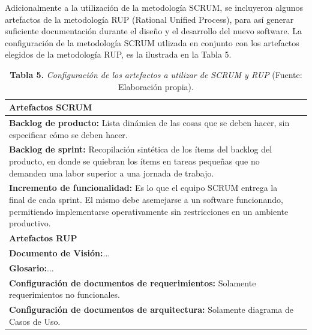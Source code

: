 \documentclass[12pt, a4paper]{article}
\begin{document}
Adicionalmente a la utilizaci\'{o}n de la metodolog\'{i}a SCRUM, se incluyeron algunos
artefactos de la metodolog\'{i}a RUP (Rational Unified Process), para as\'{i} generar suficiente documentaci\'{o}n durante el dise\~{n}o y el desarrollo del nuevo software. La configuraci\'{o}n
 de la metodolog\'{i}a SCRUM utlizada en conjunto con los artefactos elegidos de la
 metodolog\'{i}a RUP, es la ilustrada en la Tabla 5.

\begin{table}[htb]
	\small
	\centering
	\setlength{\extrarowheight}{5pt}
	\begin{tabulary}{15cm}{|L|L|}
		\hline
		\textbf{Artefactos SCRUM}\\ \hline
		\textbf{Backlog de producto:} Lista din\'{a}mica de las cosas que se deben hacer, sin especificar c\'{o}mo se deben hacer.\\ \hline
		\textbf{Backlog de sprint:} Recopilaci\'{o}n sint\'{e}tica de los \'{i}tems del backlog del producto, en donde se quiebran los \'{i}tems en tareas peque\~{n}as que no demanden una labor superior a una jornada de trabajo.\\ \hline
		\textbf{Incremento de funcionalidad:} Es lo que el equipo SCRUM entrega la final de cada sprint. El mismo debe asemejarse a un software funcionando, permitiendo implementarse operativamente sin restricciones en un ambiente productivo.\\ \hline
		\textbf{Artefactos RUP}\\ \hline
		\textbf{Documento de Visi\'{o}n:}...\\ \hline
		\textbf{Glosario:}...\\ \hline
		\textbf{Configuraci\'{o}n de documentos de requerimientos:} Solamente requerimientos no funcionales.\\ \hline
		\textbf{Configuraci\'{o}n de documentos de arquitectura:} Solamente diagrama de Casos de Uso.\\ \hline
	\end{tabulary}
	\caption{\textbf{Tabla 5.} \textit{Configuraci\'{o}n de los artefactos a utilizar de SCRUM y RUP} (Fuente: Elaboraci\'{o}n propia).}
\end{table}
\end{document}
